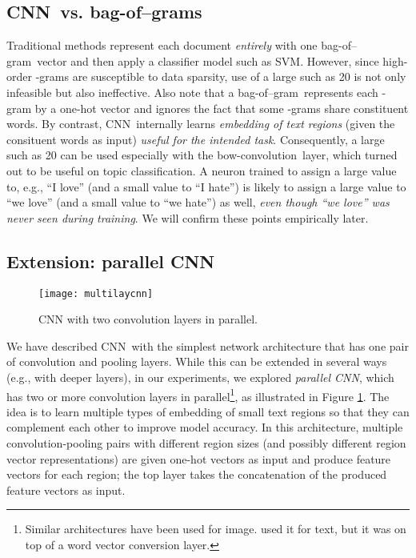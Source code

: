 \documentclass[11pt,letterpaper]{article}
\newcommand{\cnn}{CNN}
\newcommand{\bconv}{bow-convolution}
\newcommand{\bongram}{bag-of--gram}
\newcommand{\bongrams}{bag-of--grams}
\begin{document}
\subsection{\cnn\ vs. \bongrams}
\label{sec:cnn-vs-bow}
Traditional 
methods represent each document {\em entirely} with 
one \bongram\ vector 
and then apply a classifier model such as SVM. 
However, 
since high-order -grams are 
susceptible to data sparsity, use of a large  such as 20 is not only 
infeasible but also ineffective.  
Also 
note that a \bongram\ represents each -gram by a one-hot vector 
and ignores the fact that some -grams share constituent words.  
By contrast, \cnn\  internally learns {\em embedding of text regions} (given the consituent words as input) 
{\em useful for the intended task}.  
Consequently, 
a large  such as 20 can be used especially with the \bconv\ layer, 
which turned out to be useful on topic classification.
A neuron 
trained to assign a large value to, e.g., ``I love'' (and a small value to ``I hate'') 
is likely to assign a large value to ``we love'' (and a small value to ``we hate'') 
as well, {\em even though ``we love'' was never seen during training}.  
We will confirm these points empirically later.  


\subsection{Extension: parallel \cnn}

\begin{figure}
\centering
\texttt{[image: multilaycnn]}
\caption{\label{fig:multilaycnn} \footnotesize CNN with two convolution layers in parallel.  
}
\end{figure}


We have described \cnn\ with the simplest network architecture that has one pair of 
convolution and pooling layers.  While this can be extended in several ways (e.g., 
with deeper layers), in our experiments, 
we explored {\em parallel \cnn}, which has 
two or more convolution layers in parallel\footnote{
  Similar architectures have been used for image.  
   used it for text, but it was on top of a word vector conversion layer. 
}, 
as illustrated in Figure \ref{fig:multilaycnn}. 
The idea is to learn multiple types of embedding of small text regions so that they can complement 
each other to improve model accuracy.  
In this architecture, 
multiple convolution-pooling pairs with different region sizes (and possibly 
different region vector representations) are given one-hot vectors as input and produce 
feature vectors for each region; the top layer takes the concatenation of the produced 
feature vectors as input.  
\end{document}
